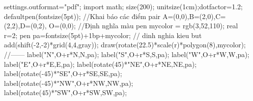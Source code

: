 \documentclass{standalone}
\begin{document}
	\begin{asy}
	settings.outformat="pdf";
	import math;
	size(200);
	unitsize(1cm);dotfactor=1.2;
	defaultpen(fontsize(5pt));
	//Khai báo các điểm
	pair A=(0,0),B=(2,0),C=(2,2),D=(0,2), O=(0,0);
	//Định nghĩa màu 
	pen mycolor = rgb(3,52,110);
	real r=2;
	pen pa=fontsize(5pt)+1bp+mycolor; // dinh nghia kieu but
	add(shift(-2,-2)*grid(4,4,gray));
	draw(rotate(22.5)*scale(r)*polygon(8),mycolor);
	//------
	label("\sffamily N",O+r*N,N,pa);
	label("\sffamily S",O+r*S,S,pa);
	label("\sffamily W",O+r*W,W,pa);
	label("\sffamily E",O+r*E,E,pa);
	label(rotate(45)*"\sffamily NE",O+r*NE,NE,pa);
	label(rotate(-45)*"\sffamily SE",O+r*SE,SE,pa);
	label(rotate(-45)*"\sffamily NW",O+r*NW,NW,pa);
	label(rotate(45)*"\sffamily SW",O+r*SW,SW,pa);
	\end{asy}
\end{document}

